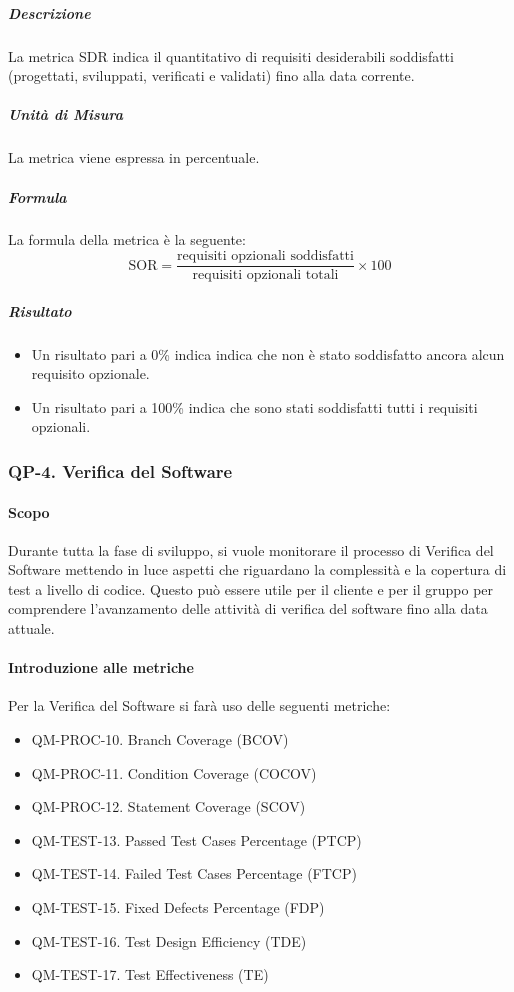 			\subparagraph{Descrizione}
			La metrica SDR indica il quantitativo di requisiti desiderabili soddisfatti (progettati, sviluppati, verificati e validati) fino alla data corrente.

			\subparagraph{Unità di Misura}
			La metrica viene espressa in percentuale.

			\subparagraph{Formula}
			La formula della metrica è la seguente:
			\[
				\text{SOR} = \frac{\text{requisiti opzionali soddisfatti}}{\text{requisiti opzionali totali}} \times 100
			\]

			\subparagraph{Risultato}
			\begin{itemize}
				\item Un risultato pari a 0\% indica indica che non è stato soddisfatto ancora alcun requisito opzionale.
				\item Un risultato pari a 100\% indica che sono stati soddisfatti tutti i requisiti opzionali.
			\end{itemize}

	\subsubsection{QP-4. Verifica del Software}

		\paragraph{Scopo}
		
		Durante tutta la fase di sviluppo, si vuole monitorare il processo di Verifica del Software mettendo in luce aspetti che riguardano la complessità e la copertura di test a livello di codice. Questo può essere utile per il cliente e per il gruppo per comprendere l'avanzamento delle attività di verifica del software fino alla data attuale.

		\paragraph{Introduzione alle metriche}

		Per la Verifica del Software si farà uso delle seguenti metriche:

		\begin{itemize}
			\item QM-PROC-10. Branch Coverage (BCOV)
			\item QM-PROC-11. Condition Coverage (COCOV)
			\item QM-PROC-12. Statement Coverage (SCOV)
			\item QM-TEST-13. Passed Test Cases Percentage (PTCP)
			\item QM-TEST-14. Failed Test Cases Percentage (FTCP)
			\item QM-TEST-15. Fixed Defects Percentage (FDP)
			\item QM-TEST-16. Test Design Efficiency (TDE)
			\item QM-TEST-17. Test Effectiveness (TE)
		\end{itemize}

